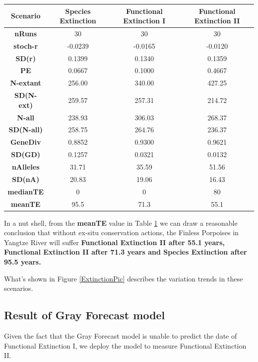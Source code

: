 \documentclass{mcmthesis}
\numberwithin{figure}{section}
\numberwithin{table}{section}
\numberwithin{equation}{section}
\begin{document}
\begin{table}[htbp]\label{Vortex_result_2}
  \centering
  \begin{tabular}{
  >{\columncolor[HTML]{FFFFFF}}c |ccc}
  \textbf{Scenario} &
    \cellcolor[HTML]{FFFFFF}\textbf{Species Extinction} &
    \cellcolor[HTML]{FFFFFF}\textbf{Functional Extinction I} &
    \cellcolor[HTML]{FFFFFF}\textbf{Functional Extinction II} \\ \hline
  \textbf{nRuns}     & 30      & 30      & 30      \\
  \textbf{stoch-r}   & -0.0239 & -0.0165 & -0.0120 \\
  \textbf{SD(r)}     & 0.1399  & 0.1340  & 0.1359  \\
  \textbf{PE}        & 0.0667  & 0.1000  & 0.4667  \\
  \textbf{N-extant}  & 256.00  & 340.00  & 427.25  \\
  \textbf{SD(N-ext)} & 259.57  & 257.31  & 214.72  \\
  \textbf{N-all}     & 238.93  & 306.03  & 268.37  \\
  \textbf{SD(N-all)} & 258.75  & 264.76  & 236.37  \\
  \textbf{GeneDiv}   & 0.8852  & 0.9300  & 0.9621  \\
  \textbf{SD(GD)}    & 0.1257  & 0.0321  & 0.0132  \\
  \textbf{nAlleles}  & 31.71   & 35.59   & 51.56   \\
  \textbf{SD(nA)}    & 20.83   & 19.06   & 16.43   \\
  \textbf{medianTE}  & 0       & 0       & 80      \\
  \textbf{meanTE}    & 95.5    & 71.3    & 55.1   
  \end{tabular}
\end{table}

In a nut shell, from the \textbf{meanTE} value in Table \ref{Vortex_result_2}
we can draw a reasonable conclusion that without ex-situ conservation actions, 
the Finless Porpoises in Yangtze River will suffer \textbf{Functional Extinction II after 
55.1 years, Functional Extinction II after 71.3 years and Species Extinction
after 95.5 years.}

What's shown in Figure \ref{ExtinctionPic} describes the variation trends in these scenarios.




\subsection{Result of Gray Forecast model}
Given the fact that the Gray Forecast model is unable to predict the date of
Functional Extinction I, we deploy the model to measure Functional Extinction II. 
\end{document}
